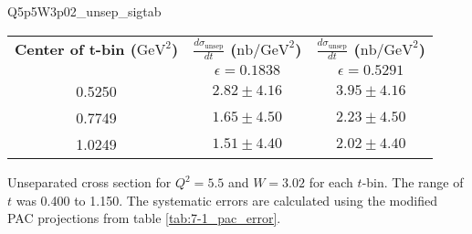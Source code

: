 \begin{Mtable}{Q5p5W3p02_unsep_sigtab}
  \centering
  \begin{tabular}{|c|c|c|}
    \hline
    \textbf{Center of t-bin ($\mathrm{GeV}^2$)} & \textbf{$\frac{d\sigma_{\mathrm{unsep}}}{dt}$ ($\mathrm{nb/GeV}^2$)} & \textbf{$\frac{d\sigma_{\mathrm{unsep}}}{dt}$ ($\mathrm{nb/GeV}^2$)} \\
    & $\epsilon=0.1838$ & $\epsilon=0.5291$ \\
    \hline
    0.5250 & $2.82\pm4.16$ & $3.95\pm4.16$\\
    0.7749 & $1.65\pm4.50$ & $2.23\pm4.50$\\
    1.0249 & $1.51\pm4.40$ & $2.02\pm4.40$\\
    \hline
  \end{tabular}
  \caption{Unseparated cross section for $Q^2=5.5$ and $W=3.02$ for each $t$-bin. The range of $t$ was 0.400 to 1.150. The systematic errors are calculated using the modified PAC projections from table \ref{tab:7-1_pac_error}.}
  \label{tab:Q5p5W3p02_unsep_sigtab}
\end{Mtable}

